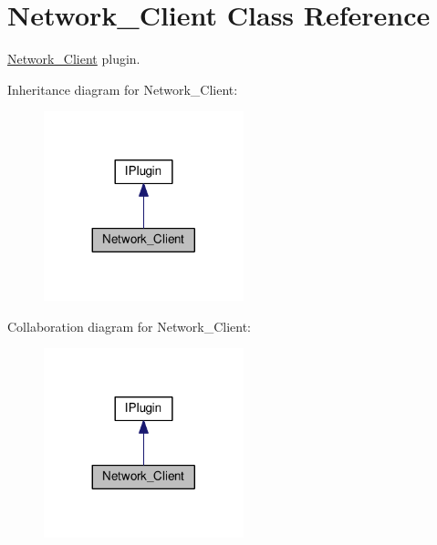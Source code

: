 \hypertarget{class_network___client}{}\section{Network\+\_\+\+Client Class Reference}
\label{class_network___client}


\hyperlink{class_network___client}{Network\+\_\+\+Client} plugin.  




Inheritance diagram for Network\+\_\+\+Client\+:\nopagebreak
\begin{figure}[H]
\begin{center}
\leavevmode
\includegraphics[width=164pt]{class_network___client__inherit__graph}
\end{center}
\end{figure}


Collaboration diagram for Network\+\_\+\+Client\+:\nopagebreak
\begin{figure}[H]
\begin{center}
\leavevmode
\includegraphics[width=164pt]{class_network___client__coll__graph}
\end{center}
\end{figure}
